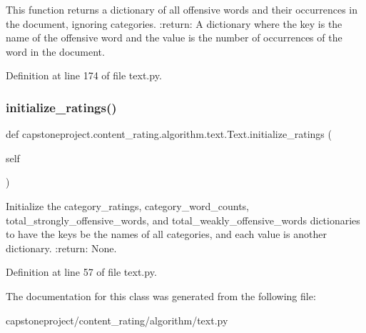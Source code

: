 \begin{DoxyVerb}This function returns a dictionary of all offensive words and
their occurrences in the document, ignoring categories.
:return: A dictionary where the key is the name of the offensive word
and the value is the number of occurrences of the word in the document.
\end{DoxyVerb}
 

Definition at line 174 of file text.\+py.

\mbox{\label{classcapstoneproject_1_1content__rating_1_1algorithm_1_1text_1_1_text_a4aa37be04d1e2098ddc3d44a2f9adb91}} 
\subsubsection{\texorpdfstring{initialize\+\_\+ratings()}{initialize\_ratings()}}
{\footnotesize\ttfamily def capstoneproject.\+content\+\_\+rating.\+algorithm.\+text.\+Text.\+initialize\+\_\+ratings (\begin{DoxyParamCaption}\item[{}]{self }\end{DoxyParamCaption})}

\begin{DoxyVerb}Initialize the category_ratings, category_word_counts,
total_strongly_offensive_words, and total_weakly_offensive_words
dictionaries to have the keys be the names of all categories,
and each value is another dictionary.
:return: None.
\end{DoxyVerb}
 

Definition at line 57 of file text.\+py.



The documentation for this class was generated from the following file\+:\begin{DoxyCompactItemize}
\item 
capstoneproject/content\+\_\+rating/algorithm/text.\+py\end{DoxyCompactItemize}
